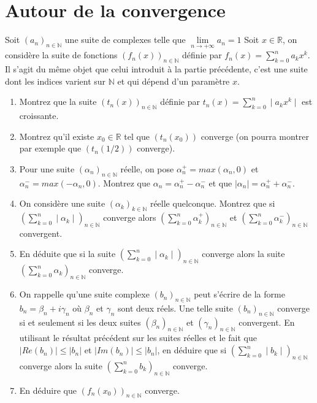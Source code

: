 \documentclass[10pt,a4paper]{article}
\begin{document}
\section{Autour de la convergence}
Soit $(a_n)_{n\in\mathbb{N}}$ une suite de complexes telle que $\lim\limits_{n\to+\infty}a_n=1$
Soit $x\in\mathbb{R}$, on considère la suite de fonctions $(f_n(x))_{n\in\mathbb{N}}$ définie par $f_n(x)=\sum\limits_{k=0}^n a_k x^k$. Il s'agit du même objet
que celui introduit à la partie précédente, c'est une suite dont les indices varient sur $\mathbb{N}$ et qui dépend d'un paramètre $x$.
\begin{enumerate}
\item Montrez que la suite $(t_n(x))_{n\in\mathbb{N}}$ définie par $t_n(x)=\sum\limits_{k=0}^n \mid a_k x^k\mid$ est croissante.
\item Montrez qu'il existe $x_0 \in \mathbb{R}$ tel que $(t_n(x_0))$ converge (on pourra montrer par exemple que $(t_n(1/2))$ converge).
\item Pour une suite $(\alpha_n)_{n\in\mathbb{N}}$ réelle, on pose $\alpha_n^+=max(\alpha_n,0)$ et $\alpha_n^-=max(-\alpha_n,0)$. Montrez que 
$\alpha_n=\alpha_n^+ - \alpha_n^-$ et que $\mid \alpha_n \mid = \alpha_n^++\alpha_n^-$.
\item On considère une suite $(\alpha_k)_{k\in\mathbb{N}}$ réelle quelconque. Montrez que si 
$(\sum\limits_{k=0}^n\mid \alpha_k\mid)_{n\in\mathbb{N}}$ converge alors  
$(\sum\limits_{k=0}^n \alpha_k^+)_{n\in\mathbb{N}}$ et $(\sum\limits_{k=0}^n\alpha_k^-)_{n\in\mathbb{N}}$ convergent. 
\item En déduite que si la suite  $(\sum\limits_{k=0}^n\mid \alpha_k\mid)_{n\in\mathbb{N}}$ converge alors la suite 
$(\sum\limits_{k=0}^n \alpha_k)_{n\in\mathbb{N}}$ converge.
\item On rappelle qu'une suite complexe $(b_n)_{n\in\mathbb{N}}$ peut s'écrire de la forme $b_n=\beta_n + i\gamma_n$ où 
$\beta_n$ et $\gamma_n$ sont deux réels.
Une telle suite $(b_n)_{n\in\mathbb{N}}$ converge si et seulement si les deux suites $(\beta_n)_{n\in\mathbb{N}}$ et 
$(\gamma_n)_{n\in\mathbb{N}}$ convergent. En utilisant le résultat précédent sur les suites réelles et le fait que $|Re(b_n)|\leqslant|b_n|$
et $|Im(b_n)|\leqslant|b_n|$, en déduire que si 
$(\sum\limits_{k=0}^n\mid b_k\mid)_{n\in\mathbb{N}}$ converge alors la suite $(\sum\limits_{k=0}^n b_k)_{n\in\mathbb{N}}$ converge.
\item En déduire que $(f_n(x_0))_{n\in\mathbb{N}}$  converge.
\end{enumerate}
\end{document}

